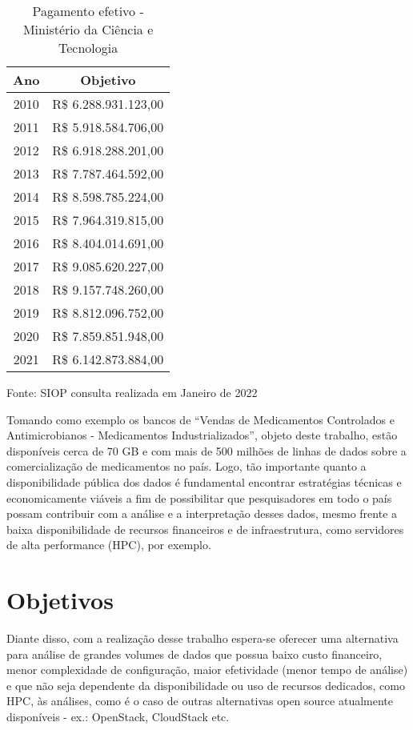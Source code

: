 \begin{table}[htpb]
\caption{Pagamento efetivo - Ministério da Ciência e Tecnologia}
\label{tab:orcamento}
\begin{tabular}{cc}
\hline
\textbf{Ano}        & \textbf{Objetivo}    \\
\hline
2010 & R\$ 6.288.931.123,00 \\
2011 & R\$ 5.918.584.706,00 \\
2012 & R\$ 6.918.288.201,00 \\
2013 & R\$ 7.787.464.592,00 \\
2014 & R\$ 8.598.785.224,00 \\
2015 & R\$ 7.964.319.815,00 \\
2016 & R\$ 8.404.014.691,00 \\
2017 & R\$ 9.085.620.227,00 \\
2018 & R\$ 9.157.748.260,00 \\
2019 & R\$ 8.812.096.752,00 \\
2020 & R\$ 7.859.851.948,00 \\
2021 & R\$ 6.142.873.884,00
\end{tabular}
    \centering
    \begin{tablenotes}
      \small
      \item{Fonte: SIOP consulta realizada em Janeiro de 2022}
    \end{tablenotes}
\end{table}

Tomando como exemplo os bancos de “Vendas de Medicamentos Controlados e Antimicrobianos - Medicamentos Industrializados”, objeto deste trabalho, estão disponíveis cerca de 70 GB e com mais de 500 milhões de linhas de dados sobre a comercialização de medicamentos no país. Logo, tão importante quanto a disponibilidade pública dos dados é fundamental encontrar estratégias técnicas e economicamente viáveis a fim de possibilitar que pesquisadores em todo o país possam contribuir com a análise e a interpretação desses dados, mesmo frente a baixa disponibilidade de recursos financeiros e de infraestrutura, como servidores de alta performance (HPC), por exemplo. 

\section{Objetivos}
\label{sec:objetivos}
Diante disso, com a realização desse trabalho espera-se oferecer uma alternativa para análise de grandes volumes de dados que possua baixo custo financeiro, menor complexidade de configuração, maior efetividade (menor tempo de análise) e que não seja dependente da disponibilidade ou uso de recursos dedicados, como HPC, às análises, como é o caso de outras alternativas open source atualmente disponíveis - ex.: OpenStack, CloudStack etc. 

